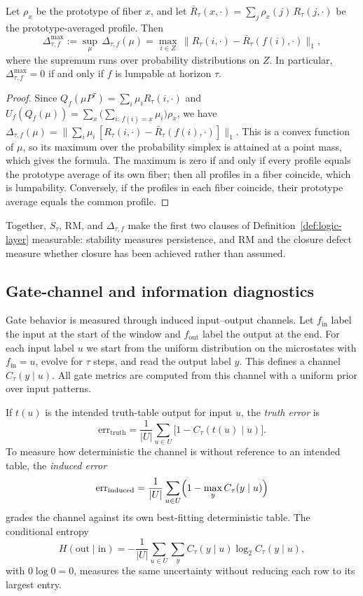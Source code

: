 \begin{lemma}
\label{lem:worst-case-defect}
Let \(\rho_x\) be the prototype of fiber \(x\), and let \(\bar R_\tau(x,\cdot)=\sum_j \rho_x(j)\,R_\tau(j,\cdot)\) be the prototype-averaged profile. Then
\[
\Delta^{\max}_{\tau,f}
:=
\sup_{\mu}\,\Delta_{\tau,f}(\mu)
=
\max_{i\in Z}\,
\bigl\|R_\tau(i,\cdot)-\bar R_\tau(f(i),\cdot)\bigr\|_1,
\]
where the supremum runs over probability distributions on \(Z\). In particular, \(\Delta^{\max}_{\tau,f}=0\) if and only if \(f\) is lumpable at horizon \(\tau\).
\end{lemma}

\begin{proof}
Since \(Q_f(\mu P^\tau)=\sum_i \mu_i R_\tau(i,\cdot)\) and \(U_f(Q_f(\mu))=\sum_x \bigl(\sum_{i:\,f(i)=x}\mu_i\bigr)\rho_x\), we have \(\Delta_{\tau,f}(\mu)=\bigl\|\sum_i \mu_i\,[R_\tau(i,\cdot)-\bar R_\tau(f(i),\cdot)]\bigr\|_1\). This is a convex function of \(\mu\), so its maximum over the probability simplex is attained at a point mass, which gives the formula. The maximum is zero if and only if every profile equals the prototype average of its own fiber; then all profiles in a fiber coincide, which is lumpability. Conversely, if the profiles in each fiber coincide, their prototype average equals the common profile.
\end{proof}

Together, \(S_\tau\), RM, and \(\Delta_{\tau,f}\) make the first two clauses of Definition~\ref{def:logic-layer} measurable: stability measures persistence, and RM and the closure defect measure whether closure has been achieved rather than assumed.

\subsection{Gate-channel and information diagnostics}

Gate behavior is measured through induced input--output channels. Let \(f_{\mathrm{in}}\) label the input at the start of the window and \(f_{\mathrm{out}}\) label the output at the end. For each input label \(u\) we start from the uniform distribution on the microstates with \(f_{\mathrm{in}}=u\), evolve for \(\tau\) steps, and read the output label \(y\). This defines a channel \(C_\tau(y\mid u)\). All gate metrics are computed from this channel with a uniform prior over input patterns.

If \(t(u)\) is the intended truth-table output for input \(u\), the \emph{truth error} is
\[
\mathrm{err}_{\mathrm{truth}}
=
\frac{1}{|U|}
\sum_{u\in U}
\bigl[1 - C_\tau(t(u)\mid u)\bigr].
\]
To measure how deterministic the channel is without reference to an intended table, the \emph{induced error}
\[
\mathrm{err}_{\mathrm{induced}}
=
\frac{1}{|U|}
\sum_{u\in U}
\Bigl(1-\max_{y} C_\tau(y\mid u)\Bigr)
\]
grades the channel against its own best-fitting deterministic table. The conditional entropy
\[
H(\mathrm{out}\mid \mathrm{in})
=
-
\frac{1}{|U|}
\sum_{u\in U}\sum_y
C_\tau(y\mid u)\log_2 C_\tau(y\mid u),
\]
with \(0\log 0 = 0\), measures the same uncertainty without reducing each row to its largest entry.

